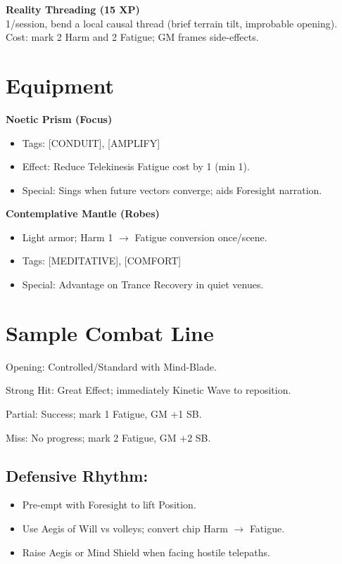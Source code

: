\documentclass[11pt]{article}
\newenvironment{talentbox}[1]{%
  \begin{mdframed}[backgroundcolor=gray!10, linewidth=1pt, linecolor=gray!50]
  \textbf{#1}\\
}{\end{mdframed}}
\begin{document}
\begin{talentbox}{Reality Threading (15 XP)}
    1/session, bend a local causal thread (brief terrain tilt, improbable opening). Cost: mark 2 Harm and 2 Fatigue; GM frames side-effects.
\end{talentbox}

\section*{Equipment}

\begin{talentbox}{Noetic Prism (Focus)}
    \begin{itemize}[leftmargin=*]
        \item Tags: [CONDUIT], [AMPLIFY]
        \item Effect: Reduce Telekinesis Fatigue cost by 1 (min 1).
        \item Special: Sings when future vectors converge; aids Foresight narration.
    \end{itemize}
\end{talentbox}

\begin{talentbox}{Contemplative Mantle (Robes)}
    \begin{itemize}[leftmargin=*]
        \item Light armor; Harm 1 $\rightarrow$ Fatigue conversion once/scene.
        \item Tags: [MEDITATIVE], [COMFORT]
        \item Special: Advantage on Trance Recovery in quiet venues.
    \end{itemize}
\end{talentbox}

\section*{Sample Combat Line}

Opening: Controlled/Standard with Mind-Blade.

Strong Hit: Great Effect; immediately Kinetic Wave to reposition.

Partial: Success; mark 1 Fatigue, GM +1 SB.

Miss: No progress; mark 2 Fatigue, GM +2 SB.

\subsection*{Defensive Rhythm:}
\begin{itemize}[leftmargin=*]
    \item Pre-empt with Foresight to lift Position.
    \item Use Aegis of Will vs volleys; convert chip Harm $\rightarrow$ Fatigue.
    \item Raise Aegis or Mind Shield when facing hostile telepaths.
\end{itemize}
\end{document}
